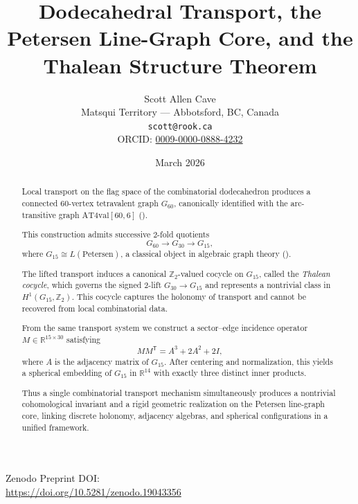 \documentclass[11pt]{article}
\title{
Dodecahedral Transport, the Petersen Line-Graph Core,
and the Thalean Structure Theorem
}
\author{
Scott Allen Cave \\
Matsqui Territory --- Abbotsford, BC, Canada \\
\texttt{scott@rook.ca} \\
ORCID: \href{https://orcid.org/0009-0000-0888-4232}{0009-0000-0888-4232}
}
\date{March 2026}
\begin{document}
\maketitle

\begin{center}
\small
Zenodo Preprint DOI: \\
\url{https://doi.org/10.5281/zenodo.19043356}
\end{center}

\begin{abstract}
Local transport on the flag space of the combinatorial dodecahedron
produces a connected $60$-vertex tetravalent graph $G_{60}$, canonically
identified with the arc-transitive graph $\mathrm{AT4val}[60,6]$
(\cite{potocnik_graphsym,house_of_graphs,potocnik_private}).

This construction admits successive $2$-fold quotients
\[
G_{60} \to G_{30} \to G_{15},
\]
where $G_{15} \cong L(\mathrm{Petersen})$, a classical object in algebraic
graph theory (\cite{godsil_royle}).

The lifted transport induces a canonical $\mathbb{Z}_2$-valued cocycle on
$G_{15}$, called the \emph{Thalean cocycle}, which governs the signed
$2$-lift $G_{30} \to G_{15}$ and represents a nontrivial class in
$H^1(G_{15},\mathbb{Z}_2)$. This cocycle captures the holonomy of transport
and cannot be recovered from local combinatorial data.

From the same transport system we construct a sector--edge incidence
operator $M \in \mathbb{R}^{15 \times 30}$ satisfying
\[
M M^{\mathsf T} = A^3 + 2A^2 + 2I,
\]
where $A$ is the adjacency matrix of $G_{15}$.
After centering and normalization, this yields a spherical embedding of
$G_{15}$ in $\mathbb{R}^{14}$ with exactly three distinct inner products.

Thus a single combinatorial transport mechanism simultaneously produces
a nontrivial cohomological invariant and a rigid geometric realization on
the Petersen line-graph core, linking discrete holonomy, adjacency
algebras, and spherical configurations in a unified framework.
\end{abstract}

















\appendix









\end{document}
